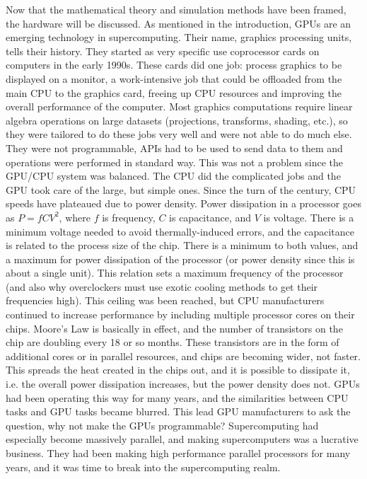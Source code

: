 Now that the mathematical theory and simulation methods have been framed, the hardware will be discussed.  As mentioned in the introduction, GPUs are an emerging technology in supercomputing.  Their name, graphics processing units, tells their history.  They started as very specific use coprocessor cards on computers in the early 1990s.  These cards did one job:  process graphics to be displayed on a monitor, a work-intensive job that could be offloaded from the main CPU to the graphics card, freeing up CPU resources and improving the overall performance of the computer.  Most graphics computations require linear algebra operations on large datasets (projections, transforms, shading, etc.), so they were tailored to do these jobs very well and were not able to do much else.  They were not programmable, APIs had to be used to send data to them and operations were performed in standard way.  This was not a problem since the GPU/CPU system was balanced.  The CPU did the complicated jobs and the GPU took care of the large, but simple ones.  Since the turn of the century, CPU speeds have plateaued due to power density.  Power dissipation in a processor goes as $P=fCV^2$, where $f$ is frequency, $C$ is capacitance, and $V$ is voltage.  There is a minimum voltage needed to avoid thermally-induced errors, and the capacitance is related to the process size of the chip.  There is a minimum to both values, and a maximum for power dissipation of the processor (or power density since this is about a single unit).  This relation sets a maximum frequency of the processor (and also why overclockers must use exotic cooling methods to get their frequencies high).  This ceiling was been reached, but CPU manufacturers continued to increase performance by including multiple processor cores on their chips.  Moore's Law is basically in effect, and the number of transistors on the chip are doubling every 18 or so months.  These transistors are in the form of additional cores or in parallel resources, and chips are becoming wider, not faster.  This spreads the heat created in the chips out, and it is possible to dissipate it, i.e. the overall power dissipation increases, but the power density does not.  GPUs had been operating this way for many years, and the similarities between CPU tasks and GPU tasks became blurred.  This lead GPU manufacturers to ask the question, why not make the GPUs programmable?  Supercomputing had especially become massively parallel, and making supercomputers was a lucrative business.  They had been making high performance parallel processors for many years, and it was time to break into the supercomputing realm.

